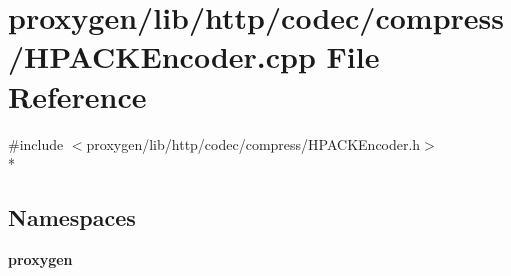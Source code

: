 \section{proxygen/lib/http/codec/compress/\+H\+P\+A\+C\+K\+Encoder.cpp File Reference}
\label{HPACKEncoder_8cpp}
{\ttfamily \#include $<$proxygen/lib/http/codec/compress/\+H\+P\+A\+C\+K\+Encoder.\+h$>$}\\*
\subsection*{Namespaces}
\begin{DoxyCompactItemize}
\item 
 {\bf proxygen}
\end{DoxyCompactItemize}
